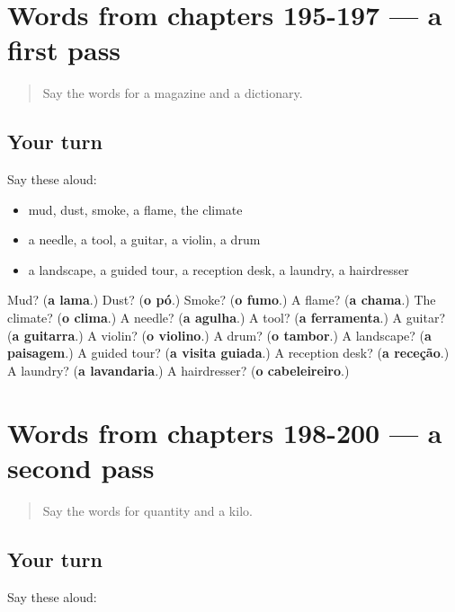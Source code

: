 \section[(dialogue)]{Words from chapters 195-197 — a first pass}

\label{lesson:PT-R200-first-pass-words-from-chapters-195-197}



\begin{quote}
Say the words for a magazine and a dictionary.
\end{quote}

\subsection*{Your turn}
Say these aloud:

\begin{itemize}
\raggedright
  \item mud, dust, smoke, a flame, the climate
  \item a needle, a tool, a guitar, a violin, a drum
  \item a landscape, a guided tour, a reception desk, a laundry, a hairdresser
\end{itemize}

\begin{tcolorbox}[breakable,colback=teal!4,colframe=teal!35!black,title={Before you move on}]
Mud? (\textbf{a lama}.) Dust? (\textbf{o pó}.) Smoke? (\textbf{o fumo}.) A flame? (\textbf{a chama}.) The climate? (\textbf{o clima}.) A needle? (\textbf{a agulha}.) A tool? (\textbf{a ferramenta}.) A guitar? (\textbf{a guitarra}.) A violin? (\textbf{o violino}.) A drum? (\textbf{o tambor}.) A landscape? (\textbf{a paisagem}.) A guided tour? (\textbf{a visita guiada}.) A reception desk? (\textbf{a receção}.) A laundry? (\textbf{a lavandaria}.) A hairdresser? (\textbf{o cabeleireiro}.)
\end{tcolorbox}
\section[(dialogue)]{Words from chapters 198-200 — a second pass}

\label{lesson:PT-R200-second-pass-words-from-chapters-198-200}



\begin{quote}
Say the words for quantity and a kilo.
\end{quote}

\subsection*{Your turn}
Say these aloud:

